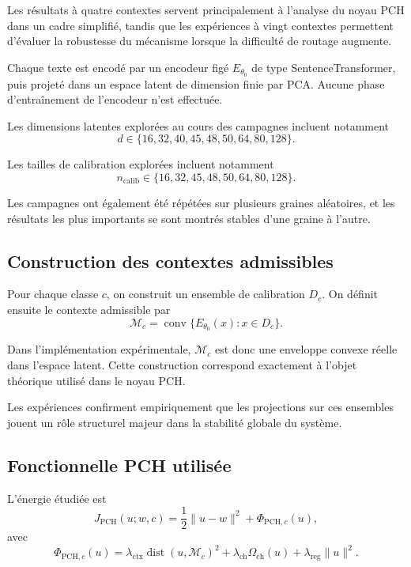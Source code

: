 \documentclass[11pt,a4paper]{article}
\newcommand{\1}{\mathbf 1}
\begin{document}
Les résultats à quatre contextes servent principalement à l’analyse du noyau PCH dans un cadre simplifié, tandis que les expériences à vingt contextes permettent d’évaluer la robustesse du mécanisme lorsque la difficulté de routage augmente.

Chaque texte est encodé par un encodeur figé \(E_{\theta_0}\) de type SentenceTransformer, puis projeté dans un espace latent de dimension finie par PCA. Aucune phase d’entraînement de l’encodeur n’est effectuée.

Les dimensions latentes explorées au cours des campagnes incluent notamment
\[
d \in \{16,32,40,45,48,50,64,80,128\}.
\]

Les tailles de calibration explorées incluent notamment
\[
n_{\mathrm{calib}} \in \{16,32,45,48,50,64,80,128\}.
\]

Les campagnes ont également été répétées sur plusieurs graines aléatoires, et les résultats les plus importants se sont montrés stables d’une graine à l’autre.

\subsection{Construction des contextes admissibles}

Pour chaque classe \(c\), on construit un ensemble de calibration \(D_c\). On définit ensuite le contexte admissible par
\[
\mathcal M_c = \operatorname{conv}\{E_{\theta_0}(x) : x \in D_c\}.
\]

Dans l’implémentation expérimentale, \(\mathcal M_c\) est donc une enveloppe convexe réelle dans l’espace latent. Cette construction correspond exactement à l’objet théorique utilisé dans le noyau PCH.

Les expériences confirment empiriquement que les projections sur ces ensembles jouent un rôle structurel majeur dans la stabilité globale du système.

\subsection{Fonctionnelle PCH utilisée}

L’énergie étudiée est
\[
J_{\mathrm{PCH}}(u;w,c)
=
\frac12\|u-w\|^2 + \Phi_{\mathrm{PCH},c}(u),
\]
avec
\[
\Phi_{\mathrm{PCH},c}(u)
=
\lambda_{\mathrm{ctx}}\operatorname{dist}(u,\mathcal M_c)^2
+
\lambda_{\mathrm{ch}}\Omega_{\mathrm{ch}}(u)
+
\lambda_{\mathrm{reg}}\|u\|^2.
\]
\end{document}
